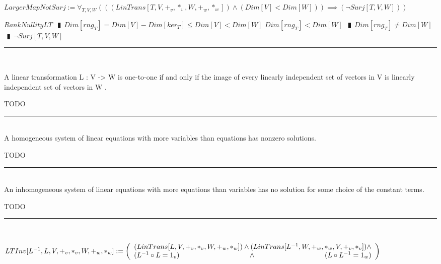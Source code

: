 \documentclass{book}
\newcommand{\abr}{:=}
\newcommand{\pipe}{$\phantom{(}\vrectangleblack\phantom{)}$}
\begin{document}
$LargerMapNotSurj \abr \forall_{T, V, W}(((LinTrans[T, V, +_v, *_v, W, +_w, *_w]) \land (Dim[V] < Dim[W])) \implies (\lnot Surj[T, V, W]))$
\begin{enumerate}
  \lit $RankNullityLT$ \pipe $Dim[rng_T] = Dim[V] - Dim[ker_T] \leq Dim[V] < Dim[W]$
  \lit $Dim[rng_T] < Dim[W]$ \pipe $Dim[rng_T] \neq Dim[W]$ \pipe $\lnot Surj[T, V, W]$
\end{enumerate} \vspace{.75mm} \hrule \vspace{.75mm} \ \\ 

\begin{shaded} %
A linear transformation L : V -> W is one-to-one if and only if the image of every linearly independent set of vectors in V is linearly independent set of vectors in W .
\begin{enumerate}
  \lit TODO
\end{enumerate} \vspace{.75mm} \hrule \vspace{.75mm} \ \\ 

A homogeneous system of linear equations with more variables than equations has nonzero solutions.
\begin{enumerate}
  \lit TODO
\end{enumerate} \vspace{.75mm} \hrule \vspace{.75mm} \ \\ 

An inhomogeneous system of linear equations with more equations than variables has no solution for some choice of the constant terms.
\begin{enumerate}
  \lit TODO
\end{enumerate} \vspace{.75mm} \hrule \vspace{.75mm} \ \\ 
\end{shaded} %

$LTInv[L^{-1}, L, V, +_v, *_v, W, +_w, *_w] \abr \left(\begin{array}{ll}
  (LinTrans[L, V, +_v, *_v, W, +_w, *_w]) \hfill \land \hfill (LinTrans[L^{-1}, W, +_w, *_w, V, +_v, *_v]) \hfill \land \hfill \\
  (L^{-1} \circ L = 1_v) \hfill \land \hfill (L \circ L^{-1} = 1_w)
\end{array}\right)$ \\
\end{document}
